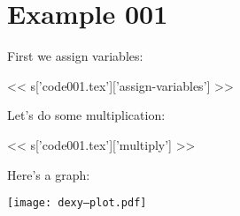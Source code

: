 \section{Example 001}

First we assign variables:

<< s['code001.tex']['assign-variables'] >>

Let's do some multiplication:

<< s['code001.tex']['multiply'] >>

Here's a graph:

\texttt{[image: dexy--plot.pdf]}

